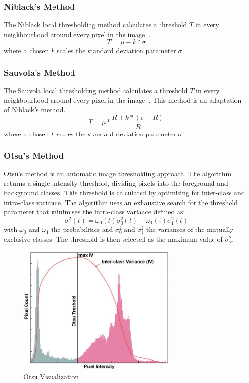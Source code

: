 \documentclass[a4paper, 12pt]{report}
\begin{document}
\subsubsection{Niblack's Method}
The Niblack local thresholding method calculates a threshold $T$ in every neighbourhood around every pixel in the image~\cite{scikit-image}.
\[T=\mu-k*\sigma\]
where a chosen $k$ scales the standard deviation parameter $\sigma$

\subsubsection{Sauvola's Method}
The Sauvola local thresholding method calculates a threshold $T$ in every neighbourhood around every pixel in the image~\cite{scikit-image}. This method is an adaptation of Niblack's method.
\[T=\mu*\frac{R+k*(\sigma-R)}{R}\]
where a chosen $k$ scales the standard deviation parameter $\sigma$

\subsubsection{Otsu's Method}
Otsu's method is an automatic image thresholding approach. The algorithm returns a single intensity threshold, dividing pixels into the foreground and background classes. This threshold is calculated by optimising for inter-class and intra-class variance. The algorithm uses an exhaustive search for the threshold parameter that minimises the intra-class variance defined as:
\[\sigma_{\omega}^{2}(t)=\omega_0(t)\sigma_0^2(t)+\omega_1(t)\sigma_1^2(t)\]
with $\omega_0$ and $\omega_1$ the probabilities and $\sigma_0^2$ and $\sigma_1^2$ the variances of the mutually exclusive classes. The threshold is then selected as the maximum value of $\sigma_{\omega}^{2}$.
\begin{figure}[ht]
    \centering
    \includegraphics[width=8cm]{otsu.png}
    \caption{Otsu Visualization~\cite{mdpi_2020}}
    \label{fig:otsu}
\end{figure}
\end{document}
